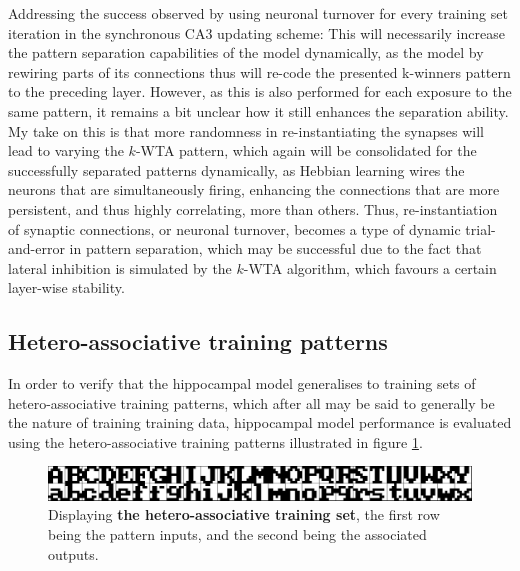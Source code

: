 Addressing the success observed by using neuronal turnover for every training set iteration in the synchronous CA3 updating scheme: 
This will necessarily increase the pattern separation capabilities of the model dynamically, as the model by rewiring parts of its connections thus will re-code the presented k-winners pattern to the preceding layer. However, as this is also performed for each exposure to the same pattern, it remains a bit unclear how it still enhances the separation ability. My take on this is that more randomness in re-instantiating the synapses will lead to varying the $k$-WTA pattern, which again will be consolidated for the successfully separated patterns dynamically, as Hebbian learning wires the neurons that are simultaneously firing, enhancing the connections that are more persistent, and thus highly correlating, more than others. Thus, re-instantiation of synaptic connections, or neuronal turnover, becomes a type of dynamic trial-and-error in pattern separation, which may be successful due to the fact that lateral inhibition is simulated by the $k$-WTA algorithm, which favours a certain layer-wise stability.

\subsection{Hetero-associative training patterns}\label{sect:hetero-associative}

In order to verify that the hippocampal model generalises to training sets of hetero-associative training patterns, which after all may be said to generally be the nature of training training data, hippocampal model performance is evaluated using the hetero-associative training patterns illustrated in figure \ref{fig:hetero-associative-patterns}.

\begin{figure}
    \centering
    \includegraphics[width=13cm]{fig/im_both_hetero}
    \caption{Displaying \textbf{the hetero-associative training set}, the first row being the pattern inputs, and the second being the associated outputs.}
    \label{fig:hetero-associative-patterns}
\end{figure}

